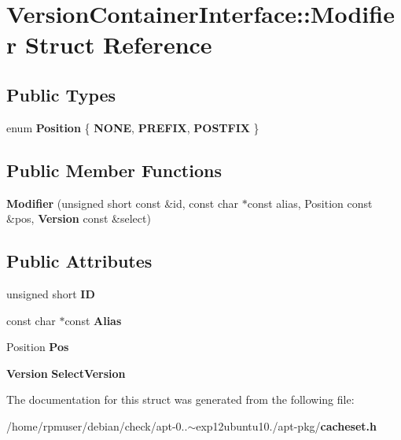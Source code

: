 \section{\-Version\-Container\-Interface\-:\-:\-Modifier \-Struct \-Reference}
\label{structAPT_1_1VersionContainerInterface_1_1Modifier}
\subsection*{\-Public \-Types}
\begin{DoxyCompactItemize}
\item 
enum {\bfseries \-Position} \{ {\bfseries \-N\-O\-N\-E}, 
{\bfseries \-P\-R\-E\-F\-I\-X}, 
{\bfseries \-P\-O\-S\-T\-F\-I\-X}
 \}
\end{DoxyCompactItemize}
\subsection*{\-Public \-Member \-Functions}
\begin{DoxyCompactItemize}
\item 
{\bfseries \-Modifier} (unsigned short const \&id, const char $\ast$const alias, \-Position const \&pos, {\bf \-Version} const \&select)\label{structAPT_1_1VersionContainerInterface_1_1Modifier_a2a8442b22bf18b4fd889e5e827908499}

\end{DoxyCompactItemize}
\subsection*{\-Public \-Attributes}
\begin{DoxyCompactItemize}
\item 
unsigned short {\bfseries \-I\-D}\label{structAPT_1_1VersionContainerInterface_1_1Modifier_a079e9ceeace88427313caef809d32dee}

\item 
const char $\ast$const {\bfseries \-Alias}\label{structAPT_1_1VersionContainerInterface_1_1Modifier_a5c49213c5e29a65db2a3378b543ca7d3}

\item 
\-Position {\bfseries \-Pos}\label{structAPT_1_1VersionContainerInterface_1_1Modifier_ab6c2931d7066526de7ed805cc1f7d90c}

\item 
{\bf \-Version} {\bfseries \-Select\-Version}\label{structAPT_1_1VersionContainerInterface_1_1Modifier_ac041f241849576c529e338673f7c6246}

\end{DoxyCompactItemize}


\-The documentation for this struct was generated from the following file\-:\begin{DoxyCompactItemize}
\item 
/home/rpmuser/debian/check/apt-\/0..$\sim$exp12ubuntu10./apt-\/pkg/{\bf cacheset.\-h}\end{DoxyCompactItemize}
